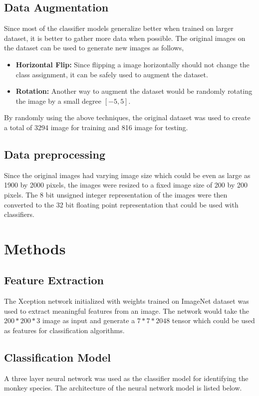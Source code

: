 \documentclass[12pt]{article}
\begin{document}
\subsection{Data Augmentation}
Since most of the classifier models generalize better when trained on larger dataset,
it is better to gather more data when possible. The original images on the dataset can be used
to generate new images as follows,

\begin{itemize}
    \item \textbf{Horizontal Flip:} Since flipping a image horizontally should not change the class assignment, it can be safely used to augment the dataset.
    \item \textbf{Rotation:} Another way to augment the dataset would be randomly rotating the image by a small degree $[-5, 5]$.
\end{itemize}

By randomly using the above techniques, the original dataset was used to create a total of 3294 image for training and 
816 image for testing.

\subsection{Data preprocessing}
Since the original images had varying image size which could be even as large as 1900 by 2000 pixels, the images were resized to a fixed image size of
200 by 200 pixels. The 8 bit unsigned integer representation of the images were then converted to the 32 bit floating point representation that could be used with
classifiers.

\section{Methods}

\subsection{Feature Extraction}
The Xception\cite{chollet2017xception} network initialized with weights trained on ImageNet dataset was used to extract meaningful features from an image.
The network would take the $200 * 200 * 3$ image as input and generate a $7 * 7 * 2048$ tensor which could be used as features for classification algorithms.

\subsection{Classification Model}
A three layer neural network was used as the classifier model for identifying the monkey species. The architecture of the neural network model is listed below.
\end{document}
